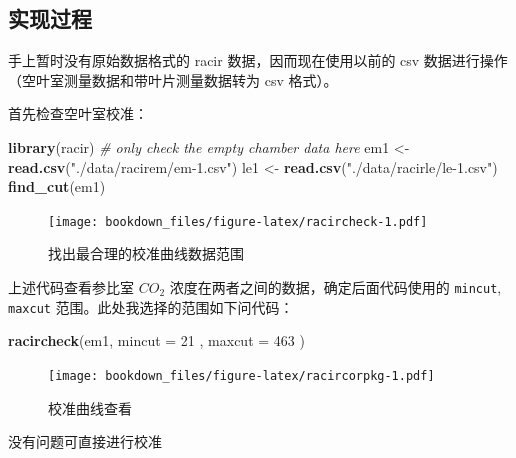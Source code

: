 \documentclass[
]{krantz}
\makeatletter
\newenvironment{Shaded}{\begin{snugshade}}{\end{snugshade}}
\newcommand{\CommentTok}[1]{\textcolor[rgb]{0.56,0.35,0.01}{\textit{#1}}}
\newcommand{\DataTypeTok}[1]{\textcolor[rgb]{0.13,0.29,0.53}{#1}}
\newcommand{\DecValTok}[1]{\textcolor[rgb]{0.00,0.00,0.81}{#1}}
\newcommand{\KeywordTok}[1]{\textcolor[rgb]{0.13,0.29,0.53}{\textbf{#1}}}
\newcommand{\NormalTok}[1]{#1}
\newcommand{\OperatorTok}[1]{\textcolor[rgb]{0.81,0.36,0.00}{\textbf{#1}}}
\newcommand{\StringTok}[1]{\textcolor[rgb]{0.31,0.60,0.02}{#1}}
\newenvironment{kframe}{%
\medskip{}
\setlength{\fboxsep}{.8em}
 \def\at@end@of@kframe{}%
 \ifinner\ifhmode%
  \def\at@end@of@kframe{\end{minipage}}%
  \begin{minipage}{\columnwidth}%
 \fi\fi%
 \def\FrameCommand##1{\hskip\@totalleftmargin \hskip-\fboxsep
 \colorbox{shadecolor}{##1}\hskip-\fboxsep
     \hskip-\linewidth \hskip-\@totalleftmargin \hskip\columnwidth}%
 \MakeFramed {\advance\hsize-\width
   \@totalleftmargin\z@ \linewidth\hsize
   \@setminipage}}%
 {\par\unskip\endMakeFramed%
 \at@end@of@kframe}
\renewenvironment{Shaded}{\begin{kframe}}{\end{kframe}}
\makeatother
\begin{document}
\hypertarget{racir_pkg_real}{%
\subsection{实现过程}\label{racir_pkg_real}}

手上暂时没有原始数据格式的 racir 数据，因而现在使用以前的 csv 数据进行操作（空叶室测量数据和带叶片测量数据转为 csv 格式）。

首先检查空叶室校准：

\begin{Shaded}
\begin{Highlighting}[]
\KeywordTok{library}\NormalTok{(racir)}
\CommentTok{# only check the empty chamber data here}
\NormalTok{em1 <-}\StringTok{ }\KeywordTok{read.csv}\NormalTok{(}\StringTok{"./data/racirem/em-1.csv"}\NormalTok{)}
\NormalTok{le1 <-}\StringTok{ }\KeywordTok{read.csv}\NormalTok{(}\StringTok{"./data/racirle/le-1.csv"}\NormalTok{)}
\KeywordTok{find_cut}\NormalTok{(em1)}
\end{Highlighting}
\end{Shaded}

\begin{figure}
\centering
\texttt{[image: bookdown\_files/figure-latex/racircheck-1.pdf]}
\caption{\label{fig:racircheck}找出最合理的校准曲线数据范围}
\end{figure}

上述代码查看参比室 \(CO_2\) 浓度在两者之间的数据，确定后面代码使用的 \texttt{mincut}, \texttt{maxcut} 范围。此处我选择的范围如下问代码：

\begin{Shaded}
\begin{Highlighting}[]
\KeywordTok{racircheck}\NormalTok{(em1, }\DataTypeTok{mincut =} \DecValTok{21}\NormalTok{ , }\DataTypeTok{maxcut =} \DecValTok{463}\NormalTok{ )}
\end{Highlighting}
\end{Shaded}

\begin{figure}
\centering
\texttt{[image: bookdown\_files/figure-latex/racircorpkg-1.pdf]}
\caption{\label{fig:racircorpkg}校准曲线查看}
\end{figure}

没有问题可直接进行校准

\begin{Shaded}
\end{Shaded}
\end{document}
